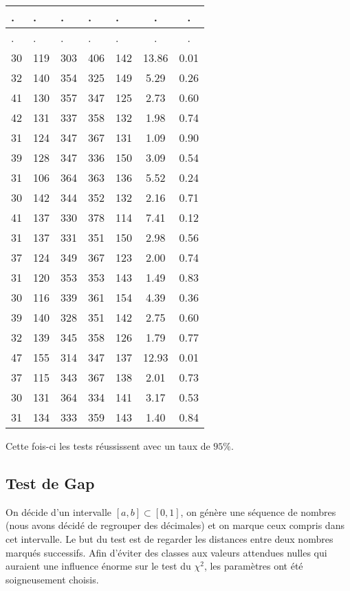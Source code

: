 \documentclass[12pt,a4paper]{article}
\begin{document}
\begin{center}
\begin{tabular}{|l|l|l|l|l|c|c|}
 . & . & . & . & . & . & . \\ \hline
 . & . & . & . & . & . & . \\ \hline
30 & 119 & 303 & 406 & 142 & 13.86 &  0.01\\ \hline
32 & 140 & 354 & 325 & 149 &  5.29 &  0.26\\ \hline
41 & 130 & 357 & 347 & 125 &  2.73 &  0.60\\ \hline
42 & 131 & 337 & 358 & 132 &  1.98 &  0.74\\ \hline
31 & 124 & 347 & 367 & 131 &  1.09 &  0.90\\ \hline
39 & 128 & 347 & 336 & 150 &  3.09 &  0.54\\ \hline
31 & 106 & 364 & 363 & 136 &  5.52 &  0.24\\ \hline
30 & 142 & 344 & 352 & 132 &  2.16 &  0.71\\ \hline
41 & 137 & 330 & 378 & 114 &  7.41 &  0.12\\ \hline
31 & 137 & 331 & 351 & 150 &  2.98 &  0.56\\ \hline
37 & 124 & 349 & 367 & 123 &  2.00 &  0.74\\ \hline
31 & 120 & 353 & 353 & 143 &  1.49 &  0.83\\ \hline
30 & 116 & 339 & 361 & 154 &  4.39 &  0.36\\ \hline
39 & 140 & 328 & 351 & 142 &  2.75 &  0.60\\ \hline
32 & 139 & 345 & 358 & 126 &  1.79 &  0.77\\ \hline
47 & 155 & 314 & 347 & 137 & 12.93 &  0.01\\ \hline
37 & 115 & 343 & 367 & 138 &  2.01 &  0.73\\ \hline
30 & 131 & 364 & 334 & 141 &  3.17 &  0.53\\ \hline
31 & 134 & 333 & 359 & 143 &  1.40 &  0.84\\ \hline
\end{tabular}
\end{center}

Cette fois-ci les tests réussissent avec un taux de $95\%$.


\subsection{Test de Gap}
On décide d'un intervalle $[a,b] \subset [0,1]$,
on génère une séquence de nombres (nous avons décidé de regrouper des décimales)
et on marque ceux compris dans cet intervalle. Le but du test est de regarder les
distances entre deux nombres marqués successifs.
Afin d'éviter des classes aux valeurs attendues nulles
qui auraient une influence énorme sur le test du $\chi^2$,
les paramètres ont été soigneusement choisis.
\end{document}
